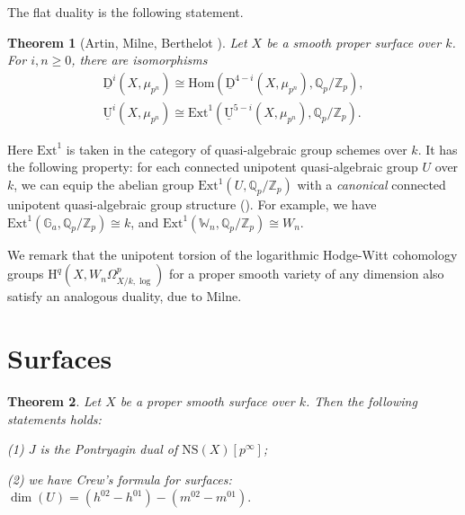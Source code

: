 \documentclass[a4paper,12pt,twoside]{report}
\newtheorem{theorem}{Theorem}[section]
\newcommand{\Q}{\mathbb{Q}}
\newcommand{\Z}{\mathbb{Z}}
\newcommand{\G}{\mathbb{G}}
\newcommand{\uU}{\underline{\mathrm{U}}}
\newcommand{\uD}{\underline{\mathrm{D}}}
\newcommand{\NS}{\mathrm{NS}}
\newcommand{\HH}{\mathrm{H}}
\newcommand{\W}{\mathbb{W}}
\begin{document}
The flat duality is the following statement.
\begin{theorem}[Artin, Milne, Berthelot \cite{Be}] \label{FlatDuality}
     Let $X$ be a smooth proper surface over $k$.
For $i,n\geqslant 0$, there are isomorphisms
\[\begin{aligned}
\uD^i(X,\mu_{p^n})\cong \mathrm{Hom}(\uD^{4-i}(X,\mu_{p^n}),\Q_p/\Z_p),\\
    \uU^i(X,\mu_{p^n}) \cong \mathrm{Ext}^1(\uU^{5-i}(X,\mu_{p^n}),\Q_p/\Z_p).
\end{aligned}
\]
\end{theorem}

Here $\mathrm{Ext}^1$ is taken in the category of quasi-algebraic group schemes over $k$. 
It has the following property: for each connected unipotent quasi-algebraic group $U$ over $k$, 
we can equip the abelian group $\mathrm{Ext}^1(U,\Q_p/\Z_p)$ with a \emph{canonical} connected unipotent quasi-algebraic group structure
(\cite[Section 8.4, p. 391]{Se}). For example, we have $\mathrm{Ext}^1(\G_a, \Q_p/\Z_p)\cong k$, and $\mathrm{Ext}^1(\W_n,\Q_p/\Z_p)\cong W_n$. 

We remark that the unipotent torsion of the logarithmic Hodge-Witt cohomology groups 
$\HH^q(X,W_n\Omega^p_{X/k,\log})$ for a proper smooth variety of any dimension also satisfy an analogous duality, 
due to Milne. 

\section{Surfaces}


\begin{theorem}\label{surfaces}
    Let $X$ be a proper smooth surface over $k$. Then the following statements holds: 

 {\rm   (1)} $J$ is the Pontryagin dual of $\NS(X)[p^\infty]$;

 {\rm   (2)} we have Crew's formula for surfaces: $\dim(U)=(h^{02}-h^{01})-(m^{02}-m^{01}).$
\end{theorem}
\end{document}
